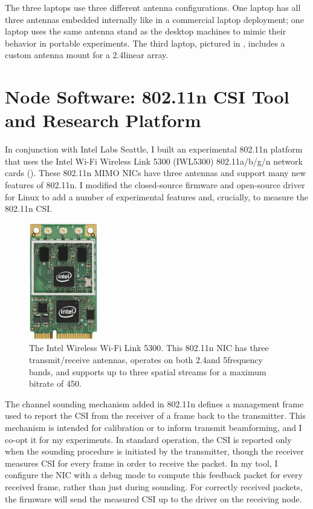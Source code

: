 The three laptops use three different antenna configurations. One laptop has all three antennas embedded internally like in a commercial laptop deployment; one laptop uses the same antenna stand as the desktop machines to mimic their behavior in portable experiments. The third laptop, pictured in , includes a custom antenna mount for a 2.4\GHz linear array.

\section{Node Software: 802.11n CSI Tool and Research Platform}
\label{sec:platform}
In conjunction with Intel Labs Seattle, I built an experimental 802.11n platform that uses the Intel Wi-Fi Wireless Link 5300 (IWL5300) 802.11a/b/g/n network cards (). These 802.11n MIMO NICs have three antennas and support many new features of 802.11n. I modified the closed-source firmware and open-source  driver for Linux to add a number of experimental features and, crucially, to measure the 802.11n CSI.

\begin{figure}
	\centering
	\includegraphics[height=2in]{figures/iwlwifi-5300.jpg}
	\caption[The Intel Wireless Wi-Fi Link 5300]{\label{fig:iwl5300}The Intel Wireless Wi-Fi Link 5300. This 802.11n NIC has three transmit/receive antennas, operates on both 2.4\GHz and 5\GHz frequency bands, and supports up to three spatial streams for a maximum bitrate of 450\Mbps.}
\end{figure}

 The channel sounding mechanism added in 802.11n defines a management frame used to report the CSI from the receiver of a frame back to the transmitter. This mechanism is intended for calibration or to inform transmit beamforming, and I co-opt it for my experiments. In standard operation, the CSI is reported only when the sounding procedure is initiated by the transmitter, though the receiver measures CSI for every frame in order to receive the packet. In my tool, I configure the NIC with a debug mode to compute this feedback packet for every received frame, rather than just during sounding. For correctly received packets, the firmware will send the measured CSI up to the driver on the receiving node.

